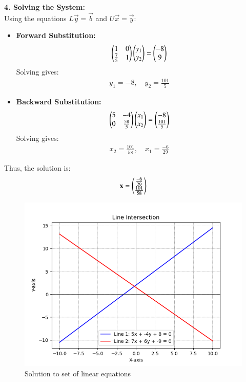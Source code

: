 \documentclass[journal]{IEEEtran}
\begin{document}
\textbf{4. Solving the System:}\\
Using the equations $L\vec{y} = \vec{b}$ and $U\vec{x} = \vec{y}$:
\begin{itemize}
    \item \textbf{Forward Substitution:}
    \begin{align}
        \begin{pmatrix}1 & 0 \\ \frac{7}{5} & 1\end{pmatrix}\begin{pmatrix}y_1 \\ y_2\end{pmatrix} = \begin{pmatrix}-8 \\ 9\end{pmatrix}
    \end{align}
    Solving gives:
    \begin{align}
        y_1 = -8, \quad y_2 = \frac{101}{5}
    \end{align}

    \item \textbf{Backward Substitution:}
    \begin{align}
        \begin{pmatrix}5 & -4 \\ 0 & \frac{58}{5}\end{pmatrix}\begin{pmatrix}x_1 \\ x_2\end{pmatrix} = \begin{pmatrix}-8 \\ \frac{101}{5}\end{pmatrix}
    \end{align}
    Solving gives:
    \begin{align}
        x_2 = \frac{101}{58}, \quad x_1 = \frac{-6}{29}
    \end{align}
\end{itemize}

Thus, the solution is:
\begin{align}
    \mathbf{x} = \begin{pmatrix}\frac{-6}{29} \\ \frac{101}{58}\end{pmatrix}
\end{align}

\begin{figure}[h!]
   \centering
   \includegraphics[width=0.7\columnwidth]{figs/fig.png}
    \caption{Solution to set of linear equations}
\end{figure}
\end{document}
